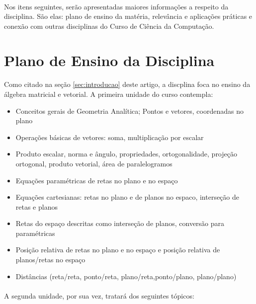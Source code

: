 \documentclass[14pt, a4paper]{article}
\begin{document}
\paragraph{}

Nos itens seguintes, serão apresentadas maiores  informações a respeito da disciplina. São elas: plano de ensino da matéria, relevância e aplicações práticas e conexão com outras disciplinas do Curso de Ciência da Computação.

\section{Plano de Ensino da Disciplina}

\paragraph{}

Como citado na seção \ref{sec:introducao} deste artigo, a discplina foca no ensino da álgebra matricial e vetorial. A primeira unidade do curso contempla:

\begin{itemize}
  \item Conceitos gerais de Geometria Analítica; Pontos e vetores, coordenadas no plano
  \item   Operações básicas de vetores: soma, multiplicação por escalar
  \item Produto escalar, norma e ângulo, propriedades, ortogonalidade, projeção ortogonal, produto vetorial, área de paralelogramos
  \item Equações paramétricas de retas no plano e no espaço
  \item Equações cartesianas: retas no plano e de planos no espaco, interseção de retas e planos
  \item  Retas do espaço descritas como interseção de planos, conversão para paramétricas
  \item Posição relativa de retas no plano e no espaço e posição relativa de planos/retas no espaço
  \item Distâncias (reta/reta, ponto/reta, plano/reta,ponto/plano, plano/plano) 
\end{itemize}

\paragraph{}

A segunda unidade, por sua vez, tratará dos seguintes tópicos:
\end{document}
